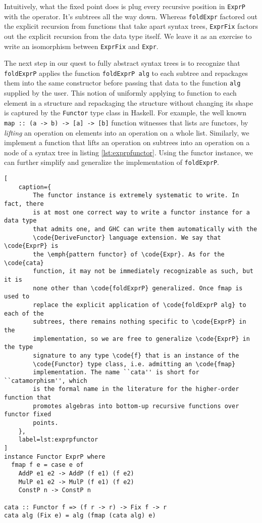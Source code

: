 \documentclass[letterpaper,11pt]{article}
\newcommand{\code}{\texttt}
\begin{document}
Intuitively, what the fixed point does is plug every recursive position in
\code{ExprP} with the operator. It's subtrees all the way down. Whereas
\code{foldExpr} factored out the explicit recursion from functions that take
apart syntax trees, \code{ExprFix} factors out the explicit recursion from the
data type itself. We leave it as an exercise to write an isomorphism between
\code{ExprFix} and \code{Expr}.

The next step in our quest to fully abstract syntax trees is to recognize that
\code{foldExprP} applies the function \code{foldExprP alg} to each subtree and
repackages them into the same constructor before passing that data to the
function \code{alg} supplied by the user. This notion of uniformly applying to
function to each element in a structure and repackaging the structure without
changing its shape is captured by the \code{Functor} type class in Haskell. For
example, the well known \code{map :: (a -> b) -> [a] -> [b]} function witnesses
that lists are functors, by \emph{lifting} an operation on elements into an
operation on a whole list. Similarly, we implement a function that lifts an
operation on subtrees into an operation on a node of a syntax tree in listing
\ref{lst:exprpfunctor}. Using the functor instance, we can further simplify and
generalize the implementation of \code{foldExprP}.

\begin{lstlisting}[
    caption={
        The functor instance is extremely systematic to write. In fact, there
        is at most one correct way to write a functor instance for a data type
        that admits one, and GHC can write them automatically with the
        \code{DeriveFunctor} language extension. We say that \code{ExprP} is
        the \emph{pattern functor} of \code{Expr}. As for the \code{cata}
        function, it may not be immediately recognizable as such, but it is
        none other than \code{foldExprP} generalized. Once fmap is used to
        replace the explicit application of \code{foldExprP alg} to each of the
        subtrees, there remains nothing specific to \code{ExprP} in the
        implementation, so we are free to generalize \code{ExprP} in the type
        signature to any type \code{f} that is an instance of the
        \code{Functor} type class, i.e. admitting an \code{fmap}
        implementation. The name ``cata'' is short for ``catamorphism'', which
        is the formal name in the literature for the higher-order function that
        promotes algebras into bottom-up recursive functions over functor fixed
        points.
    },
    label=lst:exprpfunctor
]
instance Functor ExprP where
  fmap f e = case e of
    AddP e1 e2 -> AddP (f e1) (f e2)
    MulP e1 e2 -> MulP (f e1) (f e2)
    ConstP n -> ConstP n

cata :: Functor f => (f r -> r) -> Fix f -> r
cata alg (Fix e) = alg (fmap (cata alg) e)
\end{lstlisting}
\end{document}

